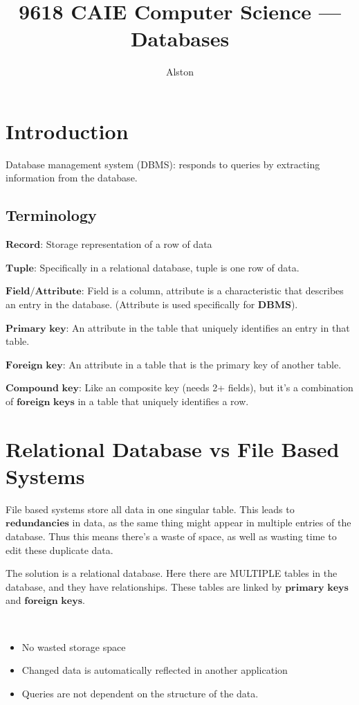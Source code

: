 \documentclass{article}
\title{9618 CAIE Computer Science — Databases}
\author{Alston}
\date{}
\theoremstyle{mytheoremstyle}
\theoremstyle{mytheoremstyle}
\theoremstyle{myproblemstyle}
\begin{document}
    \maketitle

    \section{Introduction}
    Database management system (DBMS): responds to queries by extracting information from the database.

    \subsection{Terminology}
    
    $\textbf{Record:}$ Storage representation of a row of data

    $\textbf{Tuple:}$ Specifically in a relational database, tuple is one row of data.

    $\textbf{Field/Attribute:}$ Field is a column, attribute is a characteristic that describes an entry in the database. (Attribute is used specifically for $\textbf{DBMS}$).

    $\textbf{Primary key:}$ An attribute in the table that uniquely identifies an entry in that table.

    $\textbf{Foreign key:}$ An attribute in a table that is the primary key of another table.
    
    $\textbf{Compound key:}$ Like an composite key (needs 2+ fields), but it's a combination of $\textbf{foreign keys}$ in a table that uniquely identifies a row.


    \section{Relational Database vs File Based Systems}

    File based systems store all data in one singular table. This leads to $\textbf{redundancies}$ in data, as the same thing might appear in multiple entries of the database. Thus this means there's a waste of space, as well as wasting time to edit these duplicate data.

    The solution is a relational database. Here there are MULTIPLE tables in the database, and they have relationships. These tables are linked by $\textbf{primary keys}$ and $\textbf{foreign keys}$.

    \begin{theorem} $ $
        \begin{itemize}
            \item No wasted storage space
            \item Changed data is automatically reflected in another application
            \item Queries are not dependent on the structure of the data.
        \end{itemize}
    \end{theorem}
\end{document}

